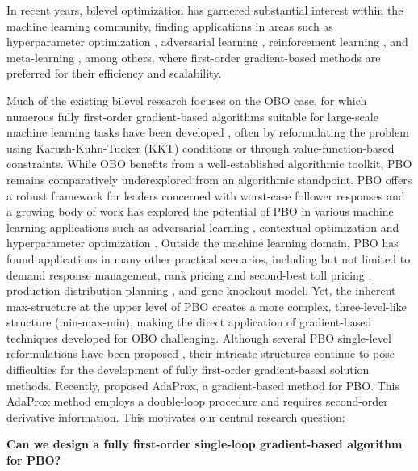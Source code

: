 \documentclass{article}
\begin{document}
In recent years, bilevel optimization has garnered substantial interest within the machine learning community, finding applications in areas such as hyperparameter optimization \cite{franceschi2017bridge}, adversarial learning \cite{zhang2022revisiting}, reinforcement learning \cite{zheng2024safe}, and meta-learning \cite{gao2020modeling}, among others, where first-order gradient-based methods are preferred for their efficiency and scalability\cite{bottou2018optimization,lin2020accelerated,sra2011optimization}.  

Much of the existing bilevel research focuses on the OBO case, for which numerous fully first-order gradient-based algorithms suitable for large-scale machine learning tasks have been developed \cite{kwon2023fully,liu2022bome,liu2024moreau,shen2023penalty}, often by reformulating the problem using Karush-Kuhn-Tucker (KKT) conditions or through value-function-based constraints.
While OBO benefits from a well-established algorithmic toolkit, PBO remains comparatively underexplored from an algorithmic standpoint. PBO offers a robust framework for leaders concerned with worst-case follower responses and a growing body of work has explored the potential of PBO in various machine learning applications such as adversarial learning \cite{bruckner2011stackelberg,benfield2024classification}, contextual optimization \cite{bucareydecision,jimenez2025pessimistic} and hyperparameter optimization \cite{ustun2024hyperparameter}. Outside the machine learning domain, PBO has found applications in many other practical scenarios, including but not limited to demand response management\cite{kis2021optimistic}, rank pricing and second-best toll pricing \cite{calvete2024novel,ban2009risk}, production-distribution planning \cite{zheng2016pessimistic}, and gene knockout model\cite{zeng2020practical}. Yet, the inherent max-structure at the upper level of PBO creates a more complex, three-level-like structure (min-max-min), making the direct application of gradient-based techniques developed for OBO challenging. Although several PBO single-level reformulations have been proposed \cite{wiesemann2013pessimistic, zeng2020practical, benchouk2024relaxation} , their intricate structures continue to pose difficulties for the development of fully first-order gradient-based solution methods. Recently, \cite{guanadaprox} proposed AdaProx, a gradient-based method for PBO. This AdaProx method employs a double-loop procedure and requires second-order derivative information. This motivates our central research question: 
\begin{center}
    \bf Can we design a fully first-order single-loop gradient-based algorithm for PBO?
\end{center}
\end{document}
